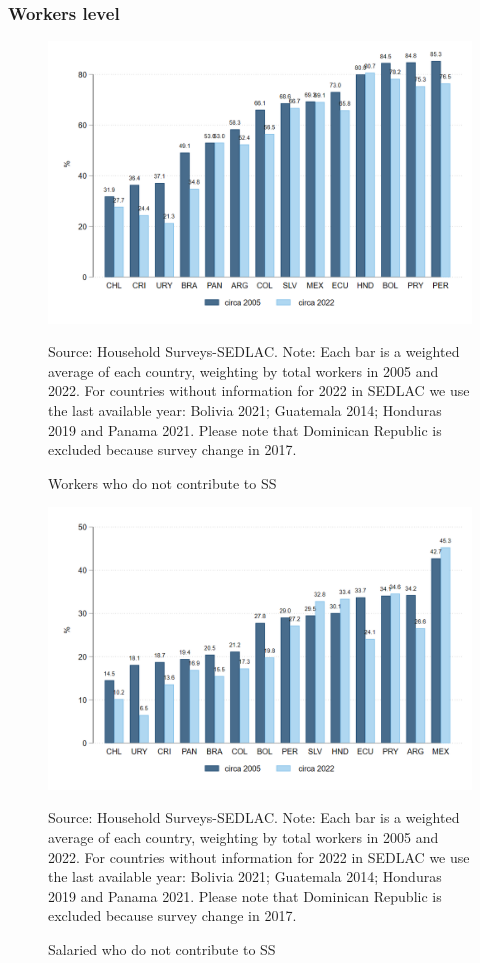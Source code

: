\documentclass[english]{article}
\begin{document}
\subsubsection{Workers level} 
\begin{figure}[H]
    \justifying
     \caption{Workers who do not contribute to SS}     
     \centerline{\includegraphics[scale=.3]{latex/figures/Snapshot/snapshot_informal_ss.png}
    \label{fig:SalariedSS}}
    \footnotesize{Source: Household Surveys-SEDLAC.}
    \footnotesize{Note: Each bar is a weighted average of each country, weighting by total workers in 2005 and 2022. For countries without information for 2022 in SEDLAC we use the last available year: Bolivia 2021; Guatemala 2014; Honduras 2019 and Panama 2021. Please note that Dominican Republic is excluded because survey change in 2017.}
\end{figure}

\begin{figure}[H]
    \justifying
     \caption{Salaried who do not contribute to SS}     
     \centerline{\includegraphics[scale=.3]{latex/figures/Snapshot/snapshot_informal_ss_dep.png}
    \label{fig:SalariedSS}}
    \footnotesize{Source: Household Surveys-SEDLAC.}
    \footnotesize{Note: Each bar is a weighted average of each country, weighting by total workers in 2005 and 2022. For countries without information for 2022 in SEDLAC we use the last available year: Bolivia 2021; Guatemala 2014; Honduras 2019 and Panama 2021. Please note that Dominican Republic is excluded because survey change in 2017.}
\end{figure}
\end{document}
